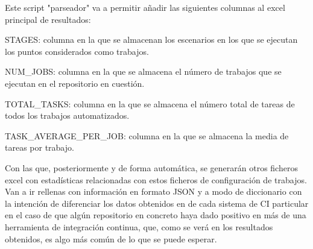 Este script "parseador" va a permitir añadir las siguientes columnas al excel principal de resultados:
\begin{compactitem}
    \item STAGES: columna en la que se almacenan los escenarios en los que se ejecutan los puntos considerados como trabajos.
    \item NUM\_JOBS: columna en la que se almacena el número de trabajos que se ejecutan en el repositorio en cuestión.
    \item TOTAL\_TASKS: columna en la que se almacena el número total de tareas de todos los trabajos automatizados.
    \item TASK\_AVERAGE\_PER\_JOB: columna en la que se almacena la media de tareas por trabajo.
\end{compactitem}

Con las que, posteriormente y de forma automática, se generarán otros ficheros excel con estadísticas relacionadas con estos ficheros de configuración de trabajos. Van a ir rellenas con información en formato JSON y a modo de diccionario con la intención de diferenciar los datos obtenidos en de cada sistema de CI particular en el caso de que algún repositorio en concreto haya dado positivo en más de una herramienta de integración continua, que, como se verá en los resultados obtenidos, es algo más común de lo que se puede esperar.

